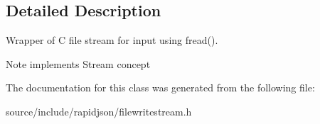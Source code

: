 \subsection{Detailed Description}
Wrapper of C file stream for input using fread(). 

\begin{DoxyNote}{Note}
implements Stream concept 
\end{DoxyNote}


The documentation for this class was generated from the following file\+:\begin{DoxyCompactItemize}
\item 
source/include/rapidjson/filewritestream.\+h\end{DoxyCompactItemize}
